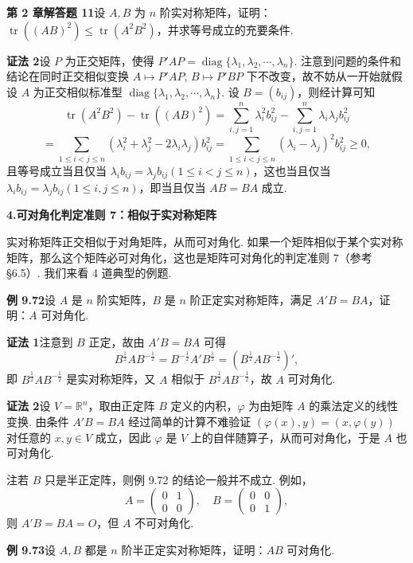 \documentclass[UTF8,12pt,a4paper,fontset=fandol]{ctexart}
\begin{document}
\noindent\textbf{第 2 章解答题 11}\quad 设 $A,B$ 为 $n$ 阶实对称矩阵，证明：$\operatorname{tr}((AB)^2)\le\operatorname{tr}(A^2B^2)$，并求等号成立的充要条件.

\noindent\textbf{证法 2}\quad 设 $P$ 为正交矩阵，使得 $P'AP=\operatorname{diag}\{\lambda_1,\lambda_2,\cdots,\lambda_n\}$. 注意到问题的条件和结论在同时正交相似变换 $A\mapsto P'AP$, $B\mapsto P'BP$ 下不改变，故不妨从一开始就假设 $A$ 为正交相似标准型 $\operatorname{diag}\{\lambda_1,\lambda_2,\cdots,\lambda_n\}$. 设 $B=(b_{ij})$，则经计算可知
\[
\operatorname{tr}(A^2B^2)-\operatorname{tr}((AB)^2)
=\sum_{i,j=1}^n\lambda_i^2b_{ij}^2-\sum_{i,j=1}^n\lambda_i\lambda_jb_{ij}^2
\]
\[
=\sum_{1\le i<j\le n}(\lambda_i^2+\lambda_j^2-2\lambda_i\lambda_j)b_{ij}^2
=\sum_{1\le i<j\le n}(\lambda_i-\lambda_j)^2b_{ij}^2\ge0,
\]
且等号成立当且仅当 $\lambda_ib_{ij}=\lambda_jb_{ij}(1\le i<j\le n)$，这也当且仅当 $\lambda_ib_{ij}=\lambda_jb_{ij}(1\le i,j\le n)$，即当且仅当 $AB=BA$ 成立.

\noindent\textbf{4.\quad 可对角化判定准则 7：相似于实对称矩阵}

实对称矩阵正交相似于对角矩阵，从而可对角化. 如果一个矩阵相似于某个实对称矩阵，那么这个矩阵必可对角化，这也是矩阵可对角化的判定准则 7（参考 §6.5）. 我们来看 4 道典型的例题.

\noindent\textbf{例 9.72}\quad 设 $A$ 是 $n$ 阶实矩阵，$B$ 是 $n$ 阶正定实对称矩阵，满足 $A'B=BA$，证明：$A$ 可对角化.

\noindent\textbf{证法 1}\quad 注意到 $B$ 正定，故由 $A'B=BA$ 可得
\[
B^{\frac12}AB^{-\frac12}=B^{-\frac12}A'B^{\frac12}=(B^{\frac12}AB^{-\frac12})',
\]
即 $B^{\frac12}AB^{-\frac12}$ 是实对称矩阵，又 $A$ 相似于 $B^{\frac12}AB^{-\frac12}$，故 $A$ 可对角化.

\noindent\textbf{证法 2}\quad 设 $V=\mathbb{R}^n$，取由正定阵 $B$ 定义的内积，$\varphi$ 为由矩阵 $A$ 的乘法定义的线性变换. 由条件 $A'B=BA$ 经过简单的计算不难验证 $(\varphi(x),y)=(x,\varphi(y))$ 对任意的 $x,y\in V$ 成立，因此 $\varphi$ 是 $V$ 上的自伴随算子，从而可对角化，于是 $A$ 也可对角化.

注\quad 若 $B$ 只是半正定阵，则例 9.72 的结论一般并不成立. 例如，
\[
A=\begin{pmatrix}0&1\\0&0\end{pmatrix},\quad
B=\begin{pmatrix}0&0\\0&1\end{pmatrix},
\]
则 $A'B=BA=O$，但 $A$ 不可对角化.

\noindent\textbf{例 9.73}\quad 设 $A,B$ 都是 $n$ 阶半正定实对称矩阵，证明：$AB$ 可对角化.
\end{document}
